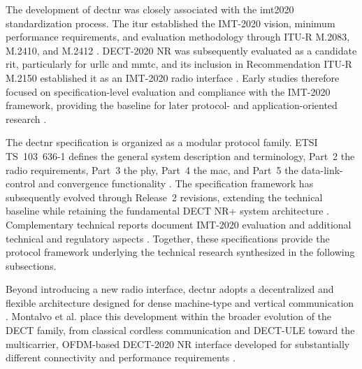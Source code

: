 The development of \gls{dectnr} was closely associated with the \gls{imt2020} standardization process. The \gls{itur} established the IMT-2020 vision, minimum performance requirements, and evaluation methodology through ITU-R M.2083, M.2410, and M.2412 \cite{itur_m2083,itur_m2410,itur_m2412}. DECT-2020 NR was subsequently evaluated as a candidate \gls{rit}, particularly for \gls{urllc} and \gls{mmtc}, and its inclusion in Recommendation ITU-R M.2150 established it as an IMT-2020 radio interface \cite{itur_m2150, maliatsosEvaluationIMT2020Candidate2022a, smidaETSIDECT2020Component2023}. Early studies therefore focused on specification-level evaluation and compliance with the IMT-2020 framework, providing the baseline for later protocol- and application-oriented research \cite{maliatsosEvaluationIMT2020Candidate2022a, smidaETSIDECT2020Component2023}.

The \gls{dectnr} specification is organized as a modular protocol family. ETSI TS~103~636-1 defines the general system description and terminology, Part~2 the radio requirements, Part~3 the \gls{phy}, Part~4 the \gls{mac}, and Part~5 the data-link-control and convergence functionality \cite{etsi_ts103636_1, etsi_ts103636_2, etsi_ts103636_3, etsi_ts103636_4, etsi_ts103636_5}. The specification framework has subsequently evolved through Release~2 revisions, extending the technical baseline while retaining the fundamental DECT NR+ system architecture \cite{etsi_ts_103636_1_r2, etsi_ts_103636_3_r2, etsi_ts_103636_4_r2}. Complementary technical reports document IMT-2020 evaluation and additional technical and regulatory aspects \cite{etsi_tr103810,etsi_tr103943,etsi_tr_103810}. Together, these specifications provide the protocol framework underlying the technical research synthesized in the following subsections.

Beyond introducing a new radio interface, \gls{dectnr} adopts a decentralized and flexible architecture designed for dense machine-type and vertical communication \cite{kovalchukovDECT2020NewRadio2022, perez-guiraoDECTNRUnveiling2022}. Montalvo et al. place this development within the broader evolution of the DECT family, from classical cordless communication and DECT-ULE toward the multicarrier, OFDM-based DECT-2020 NR interface developed for substantially different connectivity and performance requirements \cite{montalvoDECTEvolutionMeeting2024}.

